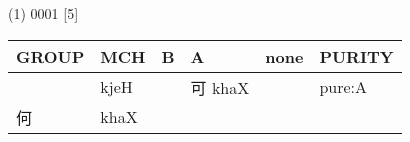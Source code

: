 \documentclass[14pt,a4paper]{scrartcl}
\date{}
\begin{document}
(1) 0001 {[}5{]}

\begin{longtable}[c]{@{}llllll@{}}
\toprule
\begin{minipage}[b]{0.14\columnwidth}\raggedright\strut
GROUP
\strut\end{minipage} &
\begin{minipage}[b]{0.14\columnwidth}\raggedright\strut
MCH
\strut\end{minipage} &
\begin{minipage}[b]{0.14\columnwidth}\raggedright\strut
B
\strut\end{minipage} &
\begin{minipage}[b]{0.14\columnwidth}\raggedright\strut
A
\strut\end{minipage} &
\begin{minipage}[b]{0.14\columnwidth}\raggedright\strut
none
\strut\end{minipage} &
\begin{minipage}[b]{0.14\columnwidth}\raggedright\strut
PURITY
\strut\end{minipage}\tabularnewline
\midrule
\endhead
\begin{minipage}[t]{0.14\columnwidth}\raggedright\strut
𠀀
\strut\end{minipage} &
\begin{minipage}[t]{0.14\columnwidth}\raggedright\strut
kjeH
\strut\end{minipage} &
\begin{minipage}[t]{0.14\columnwidth}\raggedright\strut
\strut\end{minipage} &
\begin{minipage}[t]{0.14\columnwidth}\raggedright\strut
可 khaX
\strut\end{minipage} &
\begin{minipage}[t]{0.14\columnwidth}\raggedright\strut
\strut\end{minipage} &
\begin{minipage}[t]{0.14\columnwidth}\raggedright\strut
pure:A
\strut\end{minipage}\tabularnewline
\begin{minipage}[t]{0.14\columnwidth}\raggedright\strut
何
\strut\end{minipage} &
\begin{minipage}[t]{0.14\columnwidth}\raggedright\strut
khaX
\strut\end{minipage} &
\begin{minipage}[t]{0.14\columnwidth}\raggedright\strut
\strut\end{minipage} &

\end{longtable}
\end{document}
